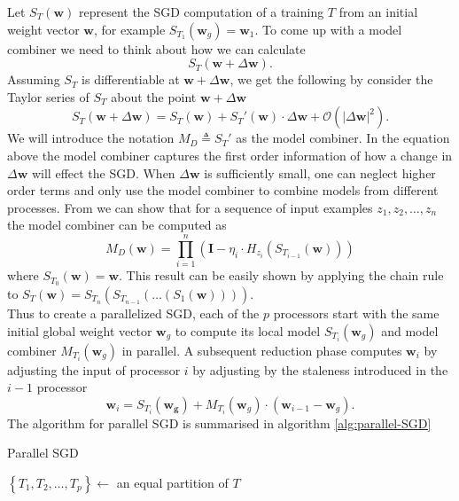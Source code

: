 Let $S_{T} \left( \bm{w} \right)$ represent the SGD computation of a training $T$ from an initial weight vector $\bm{w}$, for example $S_{T_{1}} \left( \bm{w}_{g} \right) = \bm{w}_{1}$. To come up with a model combiner we need to think about how we can calculate
\[
    S_{T} \left( \bm{w} + \Delta \bm{w} \right).
\]
Assuming $S_{T}$ is differentiable at $\bm{w} + \Delta \bm{w}$, we get the following by consider the Taylor series of $S_{T}$ about the point $\bm{w} + \Delta \bm{w}$
\[
    S_{T} \left( \bm{w} + \Delta \bm{w} \right) = S_{T} \left( \bm{w} \right) + S_{T} ' \left( \bm{w} \right) \cdot \Delta \bm{w} + \mathcal{O} \left( \left| \Delta \bm{w} \right|^{2} \right).
\]
We will introduce the notation $M_{D} \triangleq S_{T}'$ as the model combiner. In the equation above the model combiner captures the first order information of how a change in $\Delta \bm{w}$ will effect the SGD. When $\Delta \bm{w}$ is sufficiently small, one can neglect higher order terms and only use the model combiner to combine models from different processes. From \cite{MalekiSaeed2017PSGD} we can show that for a sequence of input examples $z_1 , z_2, \ldots , z_{n}$ the model combiner can be computed as
\[
    M_{D} (\bm{w}) = \prod_{i=1}^{n} \left( \bm{I} - \eta_{i} \cdot H_{z_{i}} \left( S_{T_{i-1}} \left( \bm{w} \right) \right) \right)
\]
where $S_{T_{0}} \left( \bm{w} \right) = \bm{w}$. This result can be easily shown by applying the chain rule to $S_{T} \left( \bm{w} \right) = S_{T_{n}} \left( S_{T_{n-1}} \left( \ldots \left( S_{1} \left( \bm{w} \right) \right) \right) \right)$.\\[1\baselineskip]
Thus to create a parallelized SGD, each of the $p$ processors start with the same initial global weight vector $\bm{w}_{g}$ to compute its local model $S_{T_i} \left( \bm{w}_{g} \right)$ and model combiner $M_{T_{i}} \left( \bm{w}_{g} \right)$ in parallel. A subsequent reduction phase computes $\bm{w}_{i}$ by adjusting the input of processor $i$ by adjusting by the staleness introduced in the $i-1$ processor
\[
    \bm{w}_{i} = S_{T_{i}} \left( \bm{w_{g}} \right) + M_{T_{i}} \left( \bm{w}_{g} \right) \cdot \left( \bm{w}_{i-1} - \bm{w}_{g} \right).
\]
The algorithm for parallel SGD is summarised in algorithm \ref{alg:parallel-SGD}

\begin{algorithm}[ht!!!]
    \caption{Parallel SGD}
    \label{alg:parallel-SGD}
    \SetAlgoLined
    \BlankLine
    $\left\lbrace T_{1} , T_{2}, \ldots , T_{p} \right\rbrace \gets$ an equal partition of $T$\;
    \BlankLine
\end{algorithm}